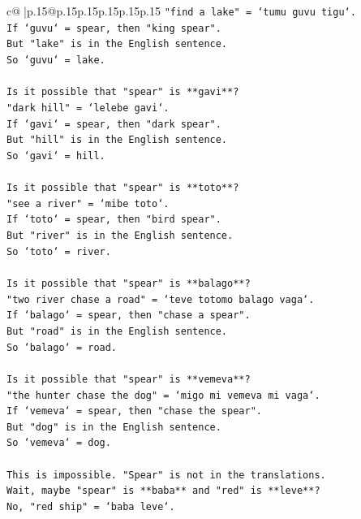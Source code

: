 \documentclass{article}
\begin{document}
{\begin{supertabular}{c@{$\;$}|p{.15\linewidth}@{}p{.15\linewidth}p{.15\linewidth}p{.15\linewidth}p{.15\linewidth}p{.15\linewidth}}
{{{\texttt{"find a lake" = `tumu guvu tigu`.} \\
\texttt{If `guvu` = spear, then "king spear".} \\
\texttt{But "lake" is in the English sentence.} \\
\texttt{So `guvu` = lake.} \\
\\ 
\texttt{Is it possible that "spear" is **gavi**?} \\
\texttt{"dark hill" = `lelebe gavi`.} \\
\texttt{If `gavi` = spear, then "dark spear".} \\
\texttt{But "hill" is in the English sentence.} \\
\texttt{So `gavi` = hill.} \\
\\ 
\texttt{Is it possible that "spear" is **toto**?} \\
\texttt{"see a river" = `mibe toto`.} \\
\texttt{If `toto` = spear, then "bird spear".} \\
\texttt{But "river" is in the English sentence.} \\
\texttt{So `toto` = river.} \\
\\ 
\texttt{Is it possible that "spear" is **balago**?} \\
\texttt{"two river chase a road" = `teve totomo balago vaga`.} \\
\texttt{If `balago` = spear, then "chase a spear".} \\
\texttt{But "road" is in the English sentence.} \\
\texttt{So `balago` = road.} \\
\\ 
\texttt{Is it possible that "spear" is **vemeva**?} \\
\texttt{"the hunter chase the dog" = `migo mi vemeva mi vaga`.} \\
\texttt{If `vemeva` = spear, then "chase the spear".} \\
\texttt{But "dog" is in the English sentence.} \\
\texttt{So `vemeva` = dog.} \\
\\ 
\texttt{This is impossible. "Spear" is not in the translations.} \\
\texttt{Wait, maybe "spear" is **baba** and "red" is **leve**?} \\
\texttt{No, "red ship" = `baba leve`.} \\
}}}
\end{supertabular}}
\end{document}
